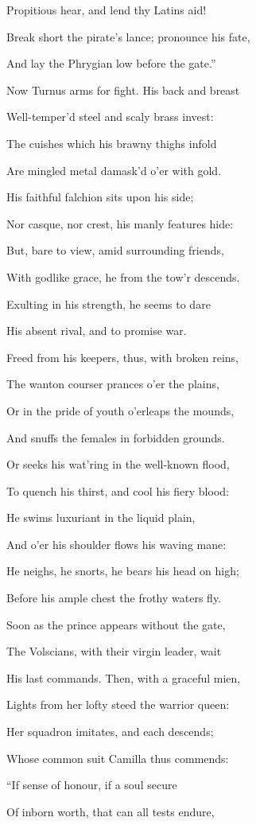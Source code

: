 Propitious hear, and lend thy Latins aid!

Break short the pirate’s lance; pronounce his fate,

And lay the Phrygian low before the gate.”

Now Turnus arms for fight. His back and breast

Well-temper’d steel and scaly brass invest:

The cuishes which his brawny thighs infold

Are mingled metal damask’d o’er with gold.

His faithful falchion sits upon his side;

Nor casque, nor crest, his manly features hide:

But, bare to view, amid surrounding friends,

With godlike grace, he from the tow’r descends.

Exulting in his strength, he seems to dare

His absent rival, and to promise war.

Freed from his keepers, thus, with broken reins,

The wanton courser prances o’er the plains,

Or in the pride of youth o’erleaps the mounds,

And snuffs the females in forbidden grounds.

Or seeks his wat’ring in the well-known flood,

To quench his thirst, and cool his fiery blood:

He swims luxuriant in the liquid plain,

And o’er his shoulder flows his waving mane:

He neighs, he snorts, he bears his head on high;

Before his ample chest the frothy waters fly.

Soon as the prince appears without the gate,

The Volscians, with their virgin leader, wait

His last commands. Then, with a graceful mien,

Lights from her lofty steed the warrior queen:

Her squadron imitates, and each descends;

Whose common suit Camilla thus commends:

“If sense of honour, if a soul secure

Of inborn worth, that can all tests endure,

